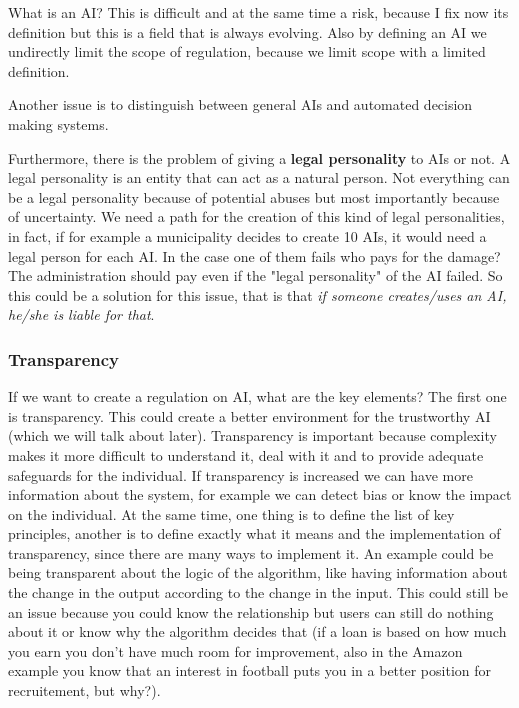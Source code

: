 What is an AI? This is difficult and at the same time a risk, because I fix now its definition but this is a field that is always evolving. Also by defining an AI we undirectly limit the scope of regulation, because we limit scope with a limited definition. 

Another issue is to distinguish between general AIs and automated decision making systems.

Furthermore, there is the problem of giving a \textbf{legal personality} to AIs or not. A legal personality is an entity that can act as a natural person. Not everything can be a legal personality because of potential abuses but most importantly because of uncertainty. We need a path for the creation of this kind of legal personalities, in fact, if for example a municipality decides to create 10 AIs, it would need a legal person for each AI. In the case one of them fails who pays for the damage? The administration should pay even if the "legal personality" of the AI failed. So this could be a solution for this issue, that is that \textit{if someone creates/uses an AI, he/she is liable for that}.

\subsubsection{Transparency}
If we want to create a regulation on AI, what are the key elements?
The first one is transparency. This could create a better environment for the trustworthy AI (which we will talk about later). 
Transparency is important because complexity makes it more difficult to understand it, deal with it and to provide adequate safeguards for the individual. If transparency is increased we can have more information about the system, for example we can detect bias or know the impact on the individual. At the same time, one thing is to define the list of key principles, another is to define exactly what it means and the implementation of transparency, since there are many ways to implement it. An example could be being transparent about the logic of the algorithm, like having information about the change in the output according to the change in the input. This could still be an issue because you could know the relationship but users can still do nothing about it or know why the algorithm decides that (if a loan is based on how much you earn you don't have much room for improvement, also in the Amazon example you know that an interest in football puts you in a better position for recruitement, but why?). 

